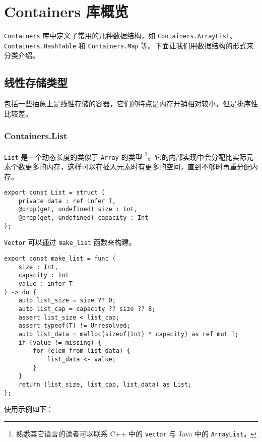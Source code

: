 \begin{introduction}
	\item 
\end{introduction}

\section{Containers 库概览}

\lstinline!Containers! 库中定义了常用的几种数据结构，如 \lstinline!Containers.ArrayList!、\lstinline!Containers.HashTable! 和 \lstinline!Containers.Map! 等。下面让我们用数据结构的形式来分类介绍。


\subsection{线性存储类型}

包括一些抽象上是线性存储的容器，它们的特点是内存开销相对较小，但是排序性比较差。

\subsubsection{Containers.List}

\lstinline!List! 是一个动态长度的类似于 \lstinline!Array! 的类型 \footnote{熟悉其它语言的读者可以联系 C++ 中的 \lstinline!vector! 与 Java 中的 \lstinline!ArrayList!。}。它的内部实现中会分配比实际元素个数更多的内存，这样可以在插入元素时有更多的空间，直到不够时再重分配内存。

\begin{lstlisting}
export const List = struct (
	private data : ref infer T,
	@prop(get, undefined) size : Int,
	@prop(get, undefined) capacity : Int
);
\end{lstlisting}

\lstinline!Vector! 可以通过 \lstinline!make_list! 函数来构建。

\begin{lstlisting}
export const make_list = func (
	size : Int,
	capacity : Int
	value : infer T
) -> do {
	auto list_size = size ?? 0;
	auto list_cap = capacity ?? size ?? 8;
	assert list_size < list_cap;
	assert typeof(T) != Unresolved;
	auto list_data = malloc(sizeof(Int) * capacity) as ref mut T;
	if (value != missing) {
		for (elem from list_data) {
			list_data <- value;
		}
	}
	return (list_size, list_cap, list_data) as List;
};
\end{lstlisting}

使用示例如下：

